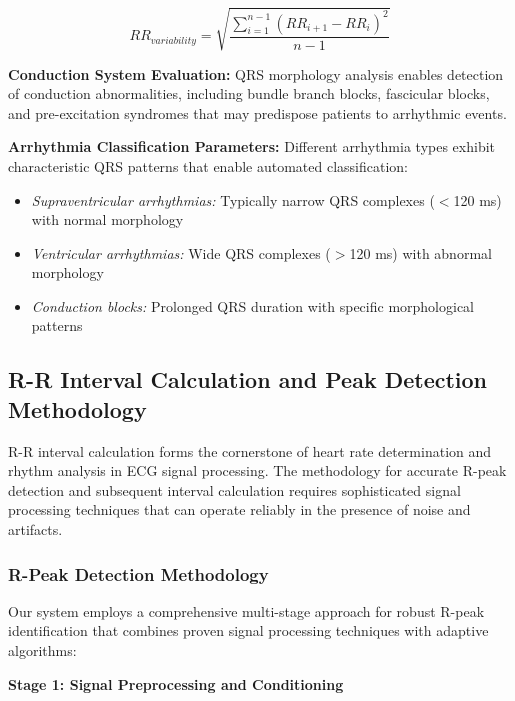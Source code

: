 \documentclass[12pt,a4paper]{article}
\begin{document}
\begin{equation*}
RR_{variability} = \sqrt{\frac{\sum_{i=1}^{n-1}(RR_{i+1} - RR_i)^2}{n-1}}
\end{equation*}

\textbf{Conduction System Evaluation:} QRS morphology analysis enables detection of conduction abnormalities, including bundle branch blocks, fascicular blocks, and pre-excitation syndromes that may predispose patients to arrhythmic events.

\vspace{0.3cm}

\textbf{Arrhythmia Classification Parameters:} Different arrhythmia types exhibit characteristic QRS patterns that enable automated classification:

\begin{itemize}
\item \textit{Supraventricular arrhythmias:} Typically narrow QRS complexes ($<$120 ms) with normal morphology
\item \textit{Ventricular arrhythmias:} Wide QRS complexes ($>$120 ms) with abnormal \\ morphology
\item \textit{Conduction blocks:} Prolonged QRS duration with specific morphological patterns
\end{itemize}

\subsection{R-R Interval Calculation and Peak Detection Methodology}

R-R interval calculation forms the cornerstone of heart rate determination and rhythm analysis in ECG signal processing. The methodology for accurate R-peak detection and subsequent interval calculation requires sophisticated signal processing techniques that can operate reliably in the presence of noise and artifacts.

\subsubsection{R-Peak Detection Methodology}

Our system employs a comprehensive multi-stage approach for robust R-peak identification that combines proven signal processing techniques with adaptive algorithms:

\vspace{0.5cm}

\textbf{Stage 1: Signal Preprocessing and Conditioning}
\end{document}
